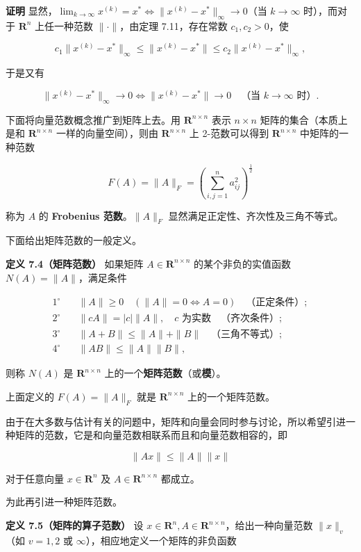 \documentclass[
  10pt,
  fontset=fandol]{ctexart}
\begin{document}
\textbf{证明}
显然，\(\lim_{k\to\infty}x^{(k)}=x^*\Longleftrightarrow\|x^{(k)}-x^*\|_\infty\to0\)（当
\(k\to\infty\) 时），而对于 \(\mathbf R^n\) 上任一种范数
\(\|\cdot\|\)，由定理 7.11，存在常数 \(c_1,c_2>0\)，使

\[
c_1\|x^{(k)}-x^*\|_\infty\leqslant\|x^{(k)}-x^*\|\leqslant c_2\|x^{(k)}-x^*\|_\infty,
\]

于是又有

\[
\|x^{(k)}-x^*\|_\infty\to0\Longleftrightarrow\|x^{(k)}-x^*\|\to0\quad\text{（当 }k\to\infty\text{ 时）}.
\]

下面将向量范数概念推广到矩阵上去。用 \(\mathbf R^{n\times n}\) 表示
\(n\times n\) 矩阵的集合（本质上是和 \(\mathbf R^{n\times n}\)
一样的向量空间），则由 \(\mathbf R^{n\times n}\) 上 2-范数可以得到
\(\mathbf R^{n\times n}\) 中矩阵的一种范数

\[
F(A)=\|A\|_F=\left(\sum_{i,j=1}^{n}a_{ij}^{2}\right)^{\frac12}
\]

称为 \(A\) 的 \textbf{Frobenius 范数}。\(\|A\|_F\)
显然满足正定性、齐次性及三角不等式。

下面给出矩阵范数的一般定义。

\textbf{定义 7.4（矩阵范数）} 如果矩阵 \(A\in\mathbf R^{n\times n}\)
的某个非负的实值函数 \(N(A)=\|A\|\)，满足条件

\[
\begin{aligned}
1^\circ\quad &\|A\|\geqslant0\quad(\|A\|=0\Longleftrightarrow A=0)\quad\text{（正定条件）};\\
2^\circ\quad &\|cA\|=|c|\|A\|,\quad c\text{ 为实数}\quad\text{（齐次条件）};\\
3^\circ\quad &\|A+B\|\leqslant\|A\|+\|B\|\quad\text{（三角不等式）};\\
4^\circ\quad &\|AB\|\leqslant\|A\|\|B\|,
\end{aligned}
\tag{7.5.4}
\]

则称 \(N(A)\) 是 \(\mathbf R^{n\times n}\)
上的一个\textbf{矩阵范数}（或\textbf{模}）。

上面定义的 \(F(A)=\|A\|_F\) 就是 \(\mathbf R^{n\times n}\)
上的一个矩阵范数。

由于在大多数与估计有关的问题中，矩阵和向量会同时参与讨论，所以希望引进一种矩阵的范数，它是和向量范数相联系而且和向量范数相容的，即

\[
\|Ax\|\leqslant\|A\|\|x\|
\tag{7.5.5}
\]

对于任意向量 \(x\in\mathbf R^n\) 及 \(A\in\mathbf R^{n\times n}\)
都成立。

为此再引进一种矩阵范数。

\textbf{定义 7.5（矩阵的算子范数）} 设
\(x\in\mathbf R^n,A\in\mathbf R^{n\times n}\)，给出一种向量范数
\(\|x\|_v\)（如 \(v=1,2\) 或 \(\infty\)），相应地定义一个矩阵的非负函数
\end{document}
